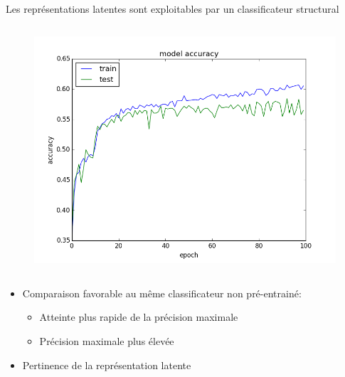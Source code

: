 \documentclass{beamer}
\begin{document}
\begin{frame}{Les représentations latentes sont exploitables par un
    classificateur structural}
\begin{columns}
    \begin{figure}
      \centering
      \includegraphics[scale=0.25]{../Figures/SpeClass}
    \end{figure}

  \end{columns}

    \begin{itemize}
     
    \item Comparaison favorable au même classificateur non pré-entrainé:
      \begin{itemize}
      \item Atteinte plus rapide de la précision maximale\pause
      \item Précision maximale plus élevée\pause
      \end{itemize}
    \item Pertinence de la représentation latente
    \end{itemize}

 \end{frame}


\end{document}
